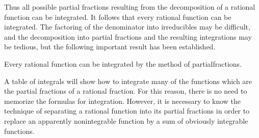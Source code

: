 Thus all possible partial fractions resulting from the decomposition of a rational function can be integrated. It follows that every rational function can be integrated. The factoring of the denominator into irreducibles may be difficult, and the decomposition into partial fractions and the resulting integrations may be tedious, but the following important result has been established.

\begin{theorem} %
Every rational function can be integrated by the method of partialfractions.
\end{theorem}

A table of integrals will show how to integrate many of the functions which are the partial fractions of a rational fraction. For this reason, there is no need to memorize the formulas for integration. However, it is necessary to know the technique of separating a rational function into its partial fractions in order to replace an apparently nonintegrable function by a sum of obviously integrable functions.


